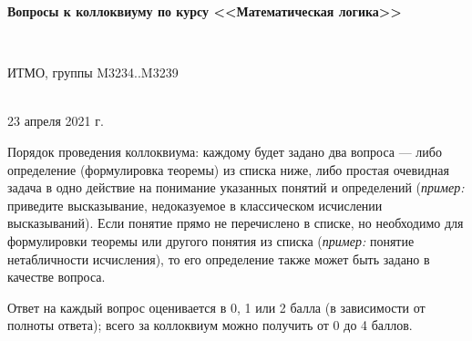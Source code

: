 \documentclass[11pt,a4paper,oneside]{article}
\begin{document}
\begin{center}
\begin{Large}{\bfseries Вопросы к коллоквиуму по курсу <<Математическая логика>>}\end{Large}\\
\vspace{1mm}
\begin{small} ИТМО, группы M3234..M3239\end{small}\\
\small 23 апреля 2021 г.
\end{center}

Порядок проведения коллоквиума: каждому будет задано два вопроса --- либо
определение (формулировка теоремы) из списка ниже, либо простая очевидная
задача в одно действие на понимание указанных понятий и определений
(\emph{пример:} приведите высказывание, недоказуемое в 
классическом исчислении высказываний). Если понятие прямо не перечислено
в списке, но необходимо для формулировки теоремы или другого понятия из 
списка (\emph{пример:} понятие нетабличности исчисления), то его определение 
также может быть задано в качестве вопроса.

Ответ на каждый вопрос оценивается в 0, 1 или 2 балла (в зависимости от полноты
ответа); всего за коллоквиум можно получить от 0 до 4 баллов.
\end{document}
